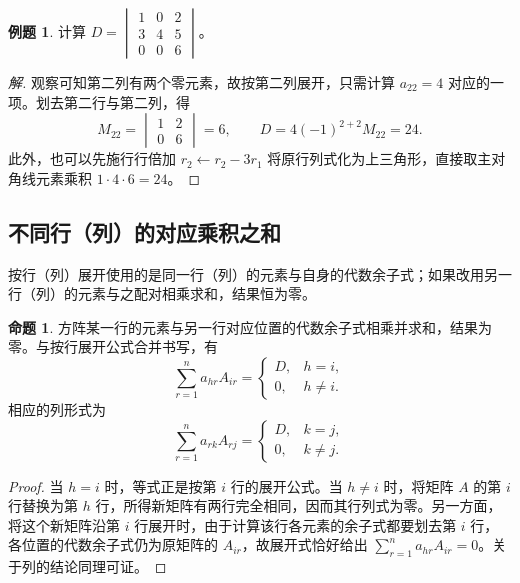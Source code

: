 \documentclass[UTF8, fontset=fandol, a4paper, 12pt]{ctexart}
\theoremstyle{definition}
\newtheorem{proposition}[theorem]{命题}
\newtheorem{example}[theorem]{例题}
\begin{document}
\begin{example}
计算 $D=\begin{vmatrix}1&0&2\\3&4&5\\0&0&6\end{vmatrix}$。
\end{example}
\begin{proof}[解]
观察可知第二列有两个零元素，故按第二列展开，只需计算 $a_{22}=4$ 对应的一项。划去第二行与第二列，得
\[
 M_{22}=\begin{vmatrix}1&2\\0&6\end{vmatrix}=6,
 \qquad D=4(-1)^{2+2}M_{22}=24.
\]
此外，也可以先施行行倍加 $r_2\leftarrow r_2-3r_1$ 将原行列式化为上三角形，直接取主对角线元素乘积 $1\cdot4\cdot6=24$。
\end{proof}

\subsection{不同行（列）的对应乘积之和}

按行（列）展开使用的是同一行（列）的元素与自身的代数余子式；如果改用另一行（列）的元素与之配对相乘求和，结果恒为零。

\begin{proposition}
方阵某一行的元素与另一行对应位置的代数余子式相乘并求和，结果为零。与按行展开公式合并书写，有
\[
 \sum_{r=1}^n a_{hr}A_{ir}
 =\begin{cases}D,&h=i,\\0,&h\ne i.\end{cases}
\]
相应的列形式为
\[
 \sum_{r=1}^n a_{rk}A_{rj}
 =\begin{cases}D,&k=j,\\0,&k\ne j.\end{cases}
\]
\end{proposition}
\begin{proof}
当 $h=i$ 时，等式正是按第 $i$ 行的展开公式。当 $h\ne i$ 时，将矩阵 $A$ 的第 $i$ 行替换为第 $h$ 行，所得新矩阵有两行完全相同，因而其行列式为零。另一方面，将这个新矩阵沿第 $i$ 行展开时，由于计算该行各元素的余子式都要划去第 $i$ 行，各位置的代数余子式仍为原矩阵的 $A_{ir}$，故展开式恰好给出 $\sum_{r=1}^n a_{hr}A_{ir}=0$。关于列的结论同理可证。
\end{proof}
\end{document}
